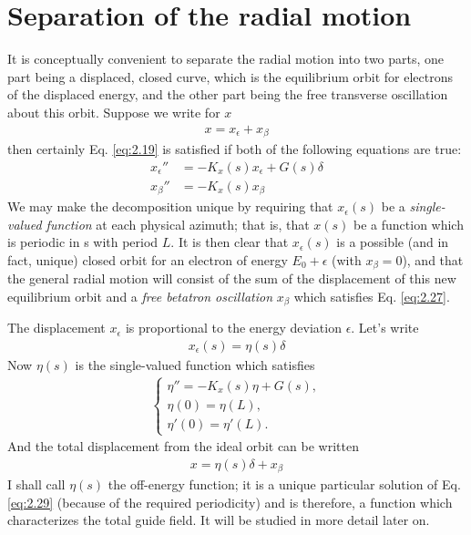 \section{Separation of the radial motion} \label{sec:2.4}
It is conceptually convenient to separate the radial motion into two parts, one part being a displaced, closed curve, which is the equilibrium orbit for electrons of the displaced energy, and the other part being the free transverse oscillation about this orbit. Suppose we write for $x$
\begin{align}
	x = x_{\epsilon} + x_{\beta}\label{eq:2.25}
\end{align}
then certainly Eq. \eqref{eq:2.19} is satisfied if both of the following equations are true:
\begin{align}
	x_\epsilon'' &= -K_x(s)x_\epsilon + G(s)\delta\label{eq:2.26}\\
	x_\beta'' &= -K_x(s)x_\beta\label{eq:2.27}
\end{align}
We may make the decomposition unique by requiring that $x_\epsilon(s)$ be a \textit{single-valued function} at each physical azimuth; that is, that $x(s)$ be a function which is periodic in s with period $L$. It is then clear that $x_\epsilon(s)$ is a possible (and in fact, unique) closed orbit for an electron of energy $E_0 + \epsilon$ (with $x_\beta = 0$), and that the general radial motion will consist of the sum of the displacement of this new equilibrium orbit and a \textit{free betatron oscillation} $x_\beta$ which satisfies Eq. \eqref{eq:2.27}.

The displacement $x_\epsilon$ is proportional to the energy deviation $\epsilon$. Let’s write
\begin{align}
	x_\epsilon(s) = \eta(s)\delta\label{eq:2.28}
\end{align}
Now $\eta(s)$ is the single-valued function which satisfies
\begin{align}\label{eq:2.29}
	\begin{cases}
		\eta'' = -K_x(s)\eta + G(s), \\
        \eta(0) = \eta(L), \\
        \eta'(0) = \eta'(L).
    \end{cases}
\end{align}
And the total displacement from the ideal orbit can be written
\begin{align}
	x = \eta(s)\delta + x_\beta
\end{align}
I shall call $\eta(s)$ the off-energy function; it is a unique particular solution of Eq. \eqref{eq:2.29} (because of the required periodicity) and is therefore, a function which characterizes the total guide field. It will be studied in more detail later on.
